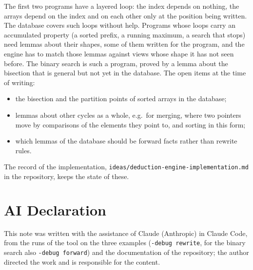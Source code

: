 \documentclass[11pt,a4paper]{article}
\begin{document}
The first two programs have a layered loop: the index depends on nothing, the arrays depend on the index and on
each other only at the position being written. The database covers such loops without help. Programs whose loops
carry an accumulated property (a sorted prefix, a running maximum, a search that stops) need lemmas about their
shapes, some of them written for the program, and the engine has to match those lemmas against views whose shape
it has not seen before. The binary search is such a program, proved by a lemma about the bisection that is general
but not yet in the database. The open items at the time of writing:
\begin{itemize}
\item the bisection and the partition points of sorted arrays in the database;
\item lemmas about other cycles as a whole, e.g.\ for merging, where two pointers move by comparisons of the
  elements they point to, and sorting in this form;
\item which lemmas of the database should be forward facts rather than rewrite rules.
\end{itemize}
The record of the implementation, \texttt{ideas/deduction-engine-implementation.md} in the repository, keeps the
state of these.

\section*{AI Declaration}

This note was written with the assistance of Claude (Anthropic) in Claude Code, from the runs of the tool on the
three examples (\texttt{-debug rewrite}, for the binary search also \texttt{-debug forward}) and the documentation of the repository; the author directed the work and
is responsible for the content.
\end{document}
